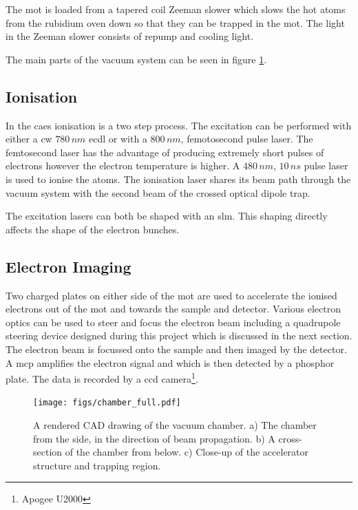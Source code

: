 The \gls{mot} is loaded from a tapered coil Zeeman slower which slows the hot atoms from the rubidium oven down so that they can be trapped in the \gls{mot}. The light in the Zeeman slower consists of repump and cooling light.

The main parts of the vacuum system can be seen in figure \ref{fig:app_complete_chamber}.

\subsection{Ionisation}

In the \gls{caes} ionisation is a two step process. The excitation can be performed with either a \gls{cw} $780\,\unit{nm}$ \gls{ecdl} or with a $800\,\unit{nm}$, femotosecond pulse laser. The femtosecond laser has the advantage of producing extremely short pulses of electrons however the electron temperature is higher\cite{mcculloch_high_2012}. A $480\,\unit{nm}$, $10\,\unit{ns}$ pulse laser is used to ionise the atoms. The ionisation laser shares its beam path through the vacuum system with the second beam of the crossed optical dipole trap.

The excitation lasers can both be shaped with an \gls{slm}\cite{mcculloch_arbitrarily_2011}. This shaping directly affects the shape of the electron bunches.

\subsection{Electron Imaging}

Two charged plates on either side of the \gls{mot} are used to accelerate the ionised electrons out of the \gls{mot} and towards the sample and detector. Various electron optics can be used to steer and focus the electron beam including a quadrupole steering device designed during this project which is discussed in the next section. The electron beam is focussed onto the sample and then imaged by the detector. A \gls{mcp} amplifies the electron signal and which is then detected by a phosphor plate. The data is recorded by a \gls{ccd} camera\footnote{Apogee U2000}.

\begin{landscape}
\begin{figure}[p]
\centering
\texttt{[image: figs/chamber\_full.pdf]}
 \caption{A rendered CAD drawing of the vacuum chamber. a) The chamber from the side, in the direction of beam propagation. b) A cross-section of the chamber from below. c) Close-up of the accelerator structure and trapping region.}
\label{fig:app_complete_chamber}
\end{figure}
\end{landscape}

